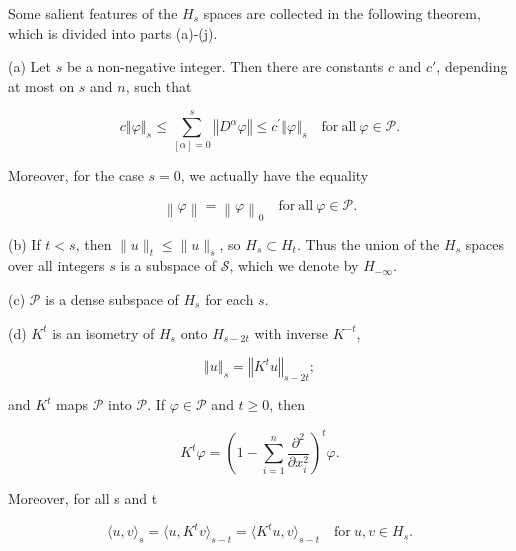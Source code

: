 Some salient features of the $H_{s}$ spaces are collected in the following theorem, which is divided into parts (a)-(j).

\begin{theorem}\label{thm:6.18}
(a) Let $s$ be a non-negative integer. Then there are constants $c$ and $c'$, depending at most on $s$ and $n$, such that

\begin{equation}
\tag{1}\label{eq:6.18:1}
c\left\Vert{\varphi}\right\Vert_{s}\leq\sum_{[\alpha]=0}^{s}\left\Vert{D^{\alpha}\varphi}\right\Vert\leq c^{\prime}\left\Vert{\varphi}\right\Vert_{s}\quad\mathrm{for\ all}\ \varphi\in\mathcal{P}.
\end{equation}

Moreover, for the case $s=0$, we actually have the equality

\begin{equation}
\tag{2}\label{eq:6.18:2}
\left\lVert{\varphi}\right\rVert=\left\lVert{\varphi}\right\rVert_{0}\quad\mathrm{for\ all}\ \varphi\in\mathcal{P}.
\end{equation}

(b) If $t < s$, then $\|u\|_t \leq \|u\|_s$, so $H_s \subset H_t$. Thus the union of the $H_s$ spaces over all integers $s$ is a subspace of $\mathcal{S}$, which we denote by $H_{-\infty}$.

(c)  $ \mathcal{P} $ is a dense subspace of  $ H_{s} $ for each $s$.

(d) $K^{t}$ is an isometry of $H_{s}$ onto $H_{s-2t}$ with inverse $K^{-t}$,


\begin{equation}
\tag{3}\label{eq:6.18:3}
\left\Vert u\right\Vert_{s}=\left\Vert K^{t}u\right\Vert_{s-2t};
\end{equation}

and  $ K^t $ maps  $ \mathcal{P} $ into  $ \mathcal{P} $. If  $ \varphi \in \mathcal{P} $ and  $ t \geq 0 $, then


\begin{equation}
\tag{4}\label{eq:6.18:4}
K^{t}\varphi=\left(1-\sum_{i=1}^{n}\frac{\partial^{2}}{\partial x_{i}^{2}}\right)^{t}\varphi.
\end{equation}

Moreover, for all s and t

\begin{equation}
\tag{5}\label{eq:6.18:5}
\langle u,v\rangle_{s}=\langle u,K^{t}v\rangle_{s-t}=\langle K^{t}u,v\rangle_{s-t}\quad\mathrm{for}\ u,v\in H_{s}.
\end{equation}


\end{theorem}
